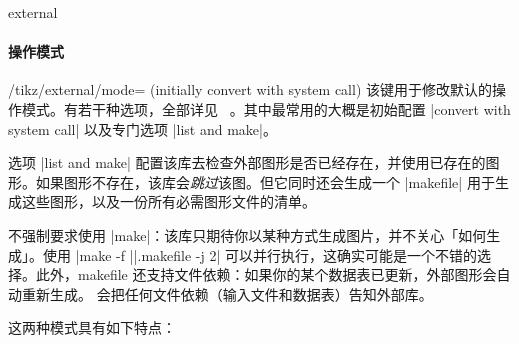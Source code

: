 {\begin{pgfplotslibrary}{external}
    \paragraph{操作模式}

    \begin{key}{/tikz/external/mode= (initially convert with system call)}
        该键用于修改默认的操作模式。有若干种选项，全部详见
        ~\cite[Section ``Externalization Library'']{tikz}。其中最常用的大概是初始配置 |convert with system call| 以及专门选项 |list and make|。

        选项 |list and make| 配置该库去检查外部图形是否已经存在，并使用已存在的图形。如果图形不存在，该库会\emph{跳过}该图。但它同时还会生成一个 |makefile| 用于生成这些图形，以及一份所有必需图形文件的清单。

        不强制要求使用 |make|：该库只期待你以某种方式生成图片，并不关心「如何生成」。使用
        |make -f ||.makefile -j 2| 可以并行执行，这确实可能是一个不错的选择。此外，makefile 还支持文件依赖：如果你的某个数据表已更新，外部图形会自动重新生成。\PGFPlots{} 会把任何文件依赖（输入文件和数据表）告知外部库。

        这两种模式具有如下特点：
    \end{key}


\end{pgfplotslibrary}}
